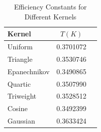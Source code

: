 \documentclass[19pt,landscape]{article}
\begin{document}
\newpage 
\begin{table}[ht]
    \centering
    \caption{Efficiency Constants for Different Kernels}
    \begin{tabular}{lcc}
    \toprule
    Kernel       & $T(K)$\\
    \midrule
    Uniform      & 0.3701072 \\
    Triangle     & 0.3530746 \\
    Epanechnikov & 0.3490865 \\
    Quartic      & 0.3507990 \\
    Triweight    & 0.3528512 \\
    Cosine       & 0.3492399 \\
    Gaussian     & 0.3633424 \\
    \bottomrule
    \end{tabular}
    \label{tab:efficiency_constants}
    \end{table}
\end{document}
